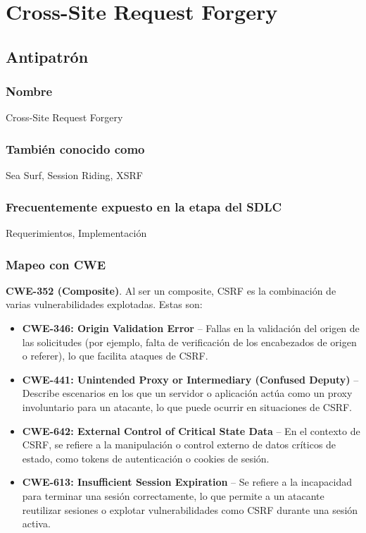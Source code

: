 \chapter{Cross-Site Request Forgery}
\section{Antipatrón}
\subsection{Nombre} 
Cross-Site Request Forgery

\subsection{También conocido como} 
Sea Surf, Session Riding, XSRF

\subsection{Frecuentemente expuesto en la etapa del SDLC} 
Requerimientos, Implementación

\subsection{Mapeo con CWE} \textbf{CWE-352 (Composite)}. Al ser un composite, CSRF es la combinación de varias vulnerabilidades explotadas. Estas son: 
\begin{itemize}
    \item \textbf{CWE-346: Origin Validation Error} – Fallas en la validación del origen de las solicitudes (por ejemplo, falta de verificación de los encabezados de origen o referer), lo que facilita ataques de CSRF.
    \item \textbf{CWE-441: Unintended Proxy or Intermediary (Confused Deputy)} – Describe escenarios en los que un servidor o aplicación actúa como un proxy involuntario para un atacante, lo que puede ocurrir en situaciones de CSRF.
    \item \textbf{CWE-642: External Control of Critical State Data} – En el contexto de CSRF, se refiere a la manipulación o control externo de datos críticos de estado, como tokens de autenticación o cookies de sesión.
    \item \textbf{CWE-613: Insufficient Session Expiration} – Se refiere a la incapacidad para terminar una sesión correctamente, lo que permite a un atacante reutilizar sesiones o explotar vulnerabilidades como CSRF durante una sesión activa.
\end{itemize}

